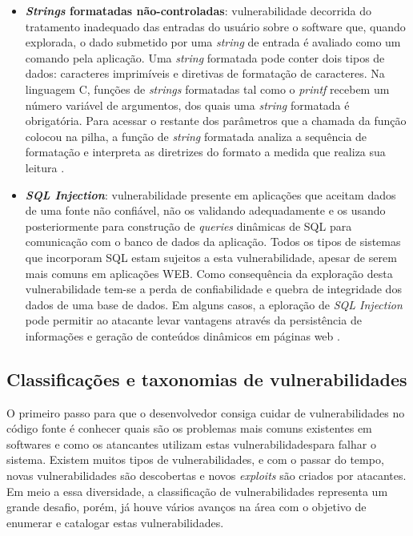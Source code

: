 \begin{itemize}
\item \textbf{\emph{Strings} formatadas não-controladas}: vulnerabilidade decorrida do tratamento inadequado das entradas do usuário sobre o software que, quando explorada, o dado submetido por uma \emph{string} de entrada é avaliado como um comando pela aplicação. Uma \emph{string} formatada pode conter dois tipos de dados: caracteres imprimíveis e diretivas de formatação de caracteres. Na linguagem C, funções de \emph{strings} formatadas tal como o \emph{printf} recebem um número variável de argumentos, dos quais uma \emph{string}  formatada é obrigatória. Para acessar o restante dos parâmetros que a chamada da função colocou na pilha, a função de \emph{string} formatada analiza a sequência de formatação e interpreta as diretrizes do formato a medida que realiza sua leitura \cite{lhee2002}.

\item \textbf{\emph{SQL Injection}}: vulnerabilidade presente em aplicações que aceitam dados de uma fonte não confiável, não os validando adequadamente e os usando posteriormente para construção de \emph{queries} dinâmicas de SQL para comunicação com o banco de dados da aplicação. Todos os tipos de sistemas que incorporam SQL estam sujeitos a esta vulnerabilidade, apesar de serem mais comuns em aplicações WEB. Como consequência da exploração desta vulnerabilidade tem-se a perda de confiabilidade e quebra de integridade dos dados de uma base de dados. Em alguns casos, a eploração de \emph{SQL Injection} pode permitir ao atacante levar vantagens através da persistência de informações e geração de conteúdos dinâmicos em páginas web \cite{uscert2012}.
\end{itemize}


\subsection{Classificações e taxonomias de vulnerabilidades}
\label{subsec-vulnerabilities-taxonomy}
%

O primeiro passo para que o desenvolvedor consiga cuidar de vulnerabilidades no código fonte é conhecer quais são os problemas mais comuns existentes em softwares e como os atancantes utilizam estas vulnerabilidadespara falhar o sistema. Existem muitos tipos de vulnerabilidades, e com o passar do tempo, novas vulnerabilidades são descobertas e novos \emph{exploits} são criados por atacantes. Em meio a essa diversidade, a classificação de vulnerabilidades representa um grande desafio, porém, já houve vários avanços na área com o objetivo de enumerar e catalogar estas vulnerabilidades.

